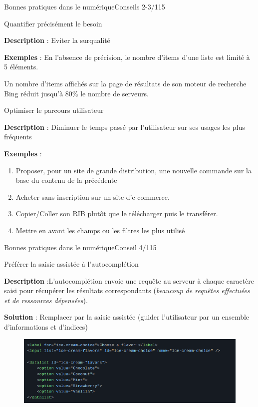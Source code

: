 \begin{frame}{Bonnes pratiques dans le numérique}{Conseils 2-3/115}

\begin{block}{Quantifier précisément le besoin}

\textbf{Description} : Eviter la surqualité

\textbf{Exemples} : En l’absence de précision, le nombre d’items d’une liste est limité à 5 éléments.

Un nombre d’items affichés sur la page de résultats de son moteur de recherche Bing réduit jusqu’à 80\% le nombre de serveurs.

\end{block}

\begin{block}{Optimiser le parcours utilisateur}

\textbf{Description} : Diminuer le temps passé par l'utilisateur sur ses usages les plus fréquents

\textbf{Exemples} : 
\begin{enumerate}
    \item Proposer, pour un site de grande distribution, une nouvelle commande sur la base du contenu de la précédente
    \item Acheter sans inscription sur un site d'e-commerce.
    \item Copier/Coller son RIB plutôt que le télécharger puis le transférer.
    \item Mettre en avant les champs ou les filtres les plus utilisé
\end{enumerate}
\end{block}


\end{frame}

\begin{frame}{Bonnes pratiques dans le numérique}{Conseil 4/115}

\begin{block}{Préférer la saisie assistée à l'autocomplétion}

\textbf{Description} :L'autocomplétion envoie une requête au serveur à chaque caractère saisi pour récupérer les résultats correspondants (\textit{beaucoup de requêtes effectuées et de ressources dépensées}).

\textbf{Solution} :
Remplacer par la saisie assistée (guider l’utilisateur par un ensemble d’informations et d’indices)


\begin{figure}
    \centering
    \includegraphics[scale=0.43]{chapitre2/wdd1/fig/codec.png}
\end{figure}


\end{block}

\end{frame}

